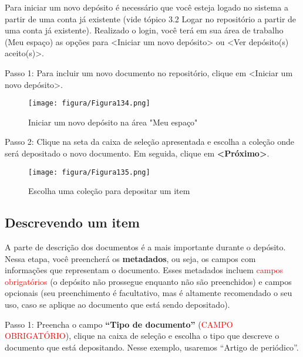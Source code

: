 \documentclass[12pt,hidelinks]{article}
\begin{document}
    \singlespacing
    
    Para iniciar um novo depósito é necessário que você esteja logado no sistema a partir de uma conta já existente (vide tópico 3.2 Logar no repositório a partir de uma conta já existente). Realizado o login, você terá em sua área de trabalho (Meu espaço) as opções para <Iniciar um novo depósito> ou <Ver depósito(s) aceito(s)>.
    
    \singlespacing
    
    Passo 1: Para incluir um novo documento no repositório, clique em <Iniciar um novo depósito>.
    
    \begin{figure}[!htp]
                \centering
                \texttt{[image: figura/Figura134.png]}
                \caption{Iniciar um novo depósito na área "Meu espaço"}
            \label{Rotulo}
        \end{figure}
    
    Passo 2: Clique na seta da caixa de seleção apresentada e escolha a coleção onde será depositado o novo documento. Em seguida, clique em \textbf{<Próximo>}.
    
    \begin{figure}[!htp]
                \centering
                \texttt{[image: figura/Figura135.png]}
                \caption{Escolha uma coleção para depositar um item}
            \label{Rotulo}
        \end{figure}

\newpage

    \subsection{Descrevendo um item}
    
    A parte de descrição dos documentos é a mais importante durante o depósito. Nessa etapa, você preencherá os \textbf{metadados}, ou seja, os campos com informações que representam o documento. Esses metadados incluem \textcolor{red}{campos obrigatórios} (o depósito não prossegue enquanto não são preenchidos) e \textcolor{applegreen}{campos opcionais} (seu preenchimento é facultativo, mas é altamente recomendado o seu uso, caso se aplique ao documento que está sendo depositado). 
    
    \singlespacing
    
    Passo 1: Preencha o campo \textbf{“Tipo de documento”} (\textcolor{red}{CAMPO OBRIGATÓRIO}), clique na caixa de seleção e escolha o tipo que descreve o documento que está depositando. Nesse exemplo, usaremos “Artigo de periódico”.
    
\end{document}
